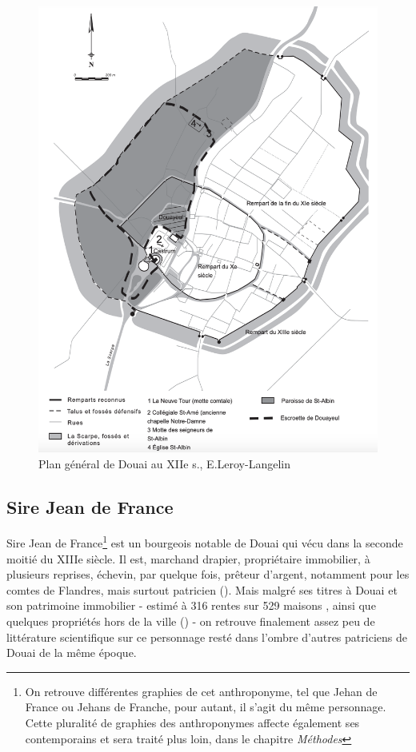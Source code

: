 \begin{figure}[ht] %
    \centering
    \includegraphics{1.Introduction/Img/Plan général de la ville de Douai avec les enceintes successives. DAO : E. Leroy-Langelin.png} 
    \caption{Plan général de Douai au XIIe s., E.Leroy-Langelin}
\end{figure}

\subsection{Sire Jean de France}
Sire Jean de France\footnote{On retrouve différentes graphies de cet anthroponyme, tel que \og Jehan de France\fg{} ou \og Jehans de Franche\fg{}, pour autant, il s'agit du même personnage. Cette pluralité de graphies des anthroponymes affecte également ses contemporains et sera traité plus loin, dans le chapitre \textit{Méthodes}} est un bourgeois notable de Douai qui vécu dans la seconde moitié du XIIIe siècle. Il est, marchand drapier, propriétaire immobilier, à plusieurs reprises, échevin, par quelque fois, prêteur d'argent, notamment pour les comtes de Flandres, mais surtout patricien (\cite{espinas_les_1933}). 
Mais malgré ses titres à Douai et son patrimoine immobilier - estimé à 316 rentes sur 529 maisons , ainsi que quelques propriétés hors de la ville (\cite{blockmans_trois_1941}) - on retrouve finalement assez peu de littérature scientifique sur ce personnage resté dans l'ombre d'autres patriciens de Douai de la même époque.

